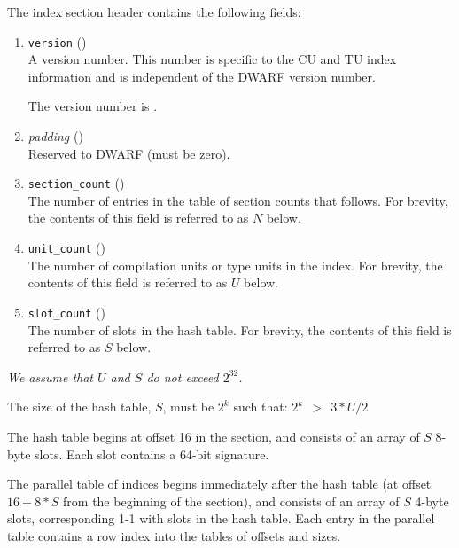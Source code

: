 The index section header contains the following fields:
\begin{enumerate}[1. ]
\item \texttt{version} (\HFTuhalf) \\
A version number.
This number is specific to the CU and TU index information
and is independent of the DWARF version number.

The version number is \versiondotdebugcuindex.

\item \textit{padding} (\HFTuhalf) \\
Reserved to DWARF (must be zero).

\item \texttt{section\_count} (\HFTuword) \\
The number of entries in the table of section counts that follows.
For brevity, the contents of this field is referred to as $N$ below.

\item \texttt{unit\_count} (\HFTuword) \\
The number of compilation units or type units in the index.
For brevity, the contents of this field is referred to as $U$ below.

\item \texttt{slot\_count} (\HFTuword) \\
The number of slots in the hash table.
For brevity, the contents of this field is referred to as $S$ below.

\end{enumerate}

\textit{We assume that $U$ and $S$ do not exceed $2^{32}$.}

The size of the hash table, $S$, must be $2^k$ such that:
\hspace{0.3cm}$2^k\ \ >\ \ 3*U/2$

The hash table begins at offset 16 in the section, and consists
of an array of $S$ 8-byte slots. Each slot contains a 64-bit
signature.

The parallel table of indices begins immediately after the hash table 
(at offset \mbox{$16 + 8 * S$} from the beginning of the section), and
consists of an array of $S$ 4-byte slots,
corresponding 1-1 with slots in the hash
table. Each entry in the parallel table contains a row index into
the tables of offsets and sizes.

